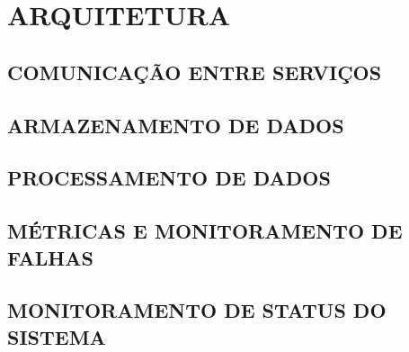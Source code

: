 \chapter{ARQUITETURA}
\label{chp:arquitetura}

\section{COMUNICAÇÃO ENTRE SERVIÇOS}

\section{ARMAZENAMENTO DE DADOS}

\section{PROCESSAMENTO DE DADOS}

\section{MÉTRICAS E MONITORAMENTO DE FALHAS}

\section{MONITORAMENTO DE STATUS DO SISTEMA}
